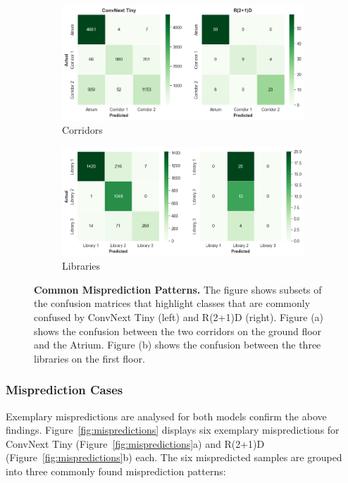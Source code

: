 \documentclass[a4paper]{article}
\begin{document}
\begin{figure}
  \centering
  \begin{subfigure}[b]{\textwidth}
    \includegraphics[width=\textwidth]{./figures/conf-matrix-corridors.png}
    \caption{Corridors}
  \end{subfigure}
  \vspace{.5cm}
  \begin{subfigure}[b]{\textwidth}
    \includegraphics[width=\textwidth]{./figures/conf-matrix-libraries.png}
    \caption{Libraries}
  \end{subfigure}
  \caption{
    \textbf{Common Misprediction Patterns.} The figure shows subsets of the
    confusion matrices that highlight classes that are commonly confused by
    ConvNext Tiny (left) and R(2+1)D (right). Figure (a) shows the confusion
    between the two corridors on the ground floor and the Atrium. Figure (b)
    shows the confusion between the three libraries on the first floor. 
  }
  \label{fig:conf-matrix-challenging}
\end{figure}

\subsubsection{Misprediction Cases} %
\label{sub:mispredictons}

Exemplary mispredictions are analysed for both models confirm the above
findings. Figure~\ref{fig:mispredictions} displays six exemplary mispredictions
for ConvNext Tiny (Figure~\ref{fig:mispredictions}a) and R(2+1)D
(Figure~\ref{fig:mispredictions}b) each. The six mispredicted samples are
grouped into three commonly found misprediction patterns:
\end{document}
